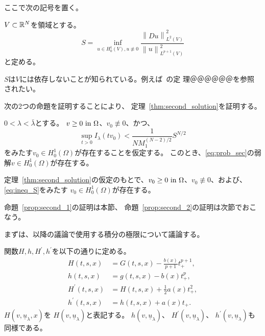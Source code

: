 ここで次の記号を置く。

\begin{nota} \label{nota:S_def}
 $V \subset \mathbb{R}^N$を領域とする。
 \begin{equation}
  S = \inf_{u \in H^1_0(V), u \not \equiv 0}
 \frac{\left\| Du \right\|_{L^2(V)}^2}{\left\| u
                                       \right\|_{L^{p+1}(V)}^2}  
 \label{eq:S_def}
 \end{equation}
 と定める。
\end{nota}

$S$は$V$には依存しないことが知られている。例えば~\cite{田中200808}の定
理＠＠＠＠＠＠を参照されたい。

次の2つの命題を証明することにより、
定理~\ref{thm:second_solution}を証明する。

\begin{prop} \label{prop:second_1}
 $0 < \lambda < \bar{\lambda}$とする。
 $v \geq 0 ~\text{in}~ \Omega$、$v_0 \not \equiv 0$、かつ、
 \begin{equation}
  \sup_{t > 0} I_\lambda (tv_0) < \frac{1}{NM_1^{(N-2)/2}} S^{N/2} 
   \label{eq:ineq_S}
 \end{equation}
 をみたす$v_0 \in H_0^1(\Omega)$が存在することを仮定する。
 このとき、\ref{eq:prob_sec}の弱解$v \in H_0^1(\Omega)$が存在する。
\end{prop}

\begin{prop} \label{prop:second_2}
 定理~\ref{thm:second_solution}の仮定のもとで、$v_0 \geq 0 ~\text{in}~
 \Omega$、$v_0 \not \equiv 0$、および、\eqref{eq:ineq_S}をみたす
 $v_0 \in H_0^1(\Omega)$が存在する。
\end{prop}

命題~\ref{prop:second_1}の証明は本節、
命題~\ref{prop:second_2}の証明は次節でおこなう。

まずは、以降の議論で使用する積分の極限について議論する。

\begin{nota}
 関数$H, h, H^\prime, h^\prime$を以下の通りに定める。
 \begin{align*}
  H(t, s, x) &= G(t, s, x) - \frac{b(x)}{p+1} t_+ ^{p+1}, \\
  h(t, s, x) &= g(t, s, x) - b(x) t_+ ^{p}, \\
  H^\prime (t, s, x) &= H(t, s, x) + \frac{1}{2}a(x) t_+^2, \\
  h^\prime (t, s, x) &= h(t, s, x) + a(x) t_+.
 \end{align*}
 $H(v, \underline{u}_\lambda, x)$を
 $H(v, \underline{u}_\lambda)$と表記する。
 $h(v, \underline{u}_\lambda)$、
 $H^\prime(v, \underline{u}_\lambda)$、
 $h^\prime(v, \underline{u}_\lambda)$も同様である。
\end{nota}

